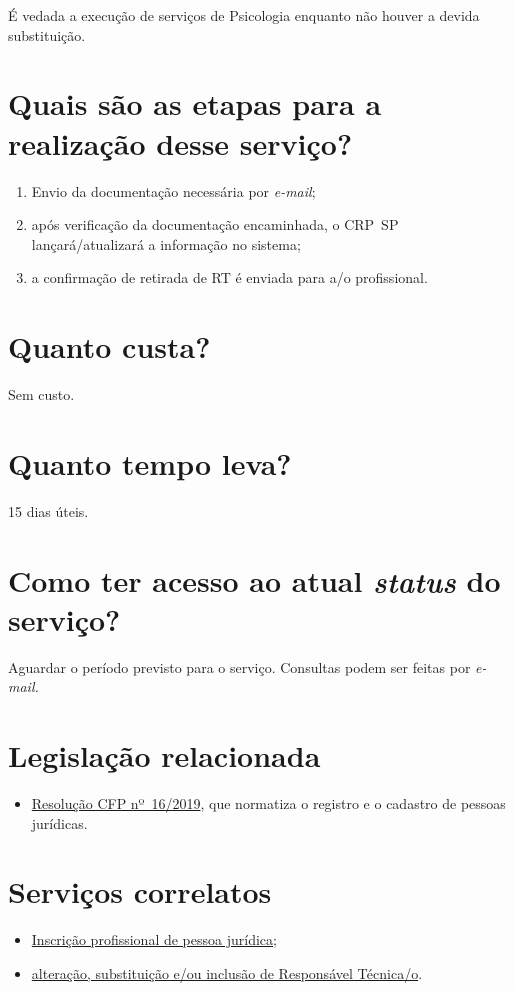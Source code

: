 É vedada a execução de serviços de Psicologia enquanto não houver a devida substituição.

\section{Quais são as etapas para a realização desse serviço?}

\begin{enumerate}
  \item  Envio da documentação necessária por \emph{e-mail};
  \item  após verificação da documentação encaminhada, o CRP~SP  lançará/atualizará a informação no sistema;
  \item  a confirmação de retirada de RT é enviada para a/o  profissional.
\end{enumerate}

\section{Quanto custa?}

Sem custo.

\section{Quanto tempo leva?}

15 dias úteis.

\section{Como ter acesso ao atual \emph{status} do serviço?}

Aguardar o período previsto para o serviço. Consultas podem ser feitas por \emph{e-mail.}

\section{Legislação relacionada}

\begin{itemize}
  \item  \href{https://atosoficiais.com.br/cfp/resolucao-administrativa-financeira-n-16-2019-altera-o-manual-de-procedimentos-administrativo-e-financeiro-do-sistema-conselhos-de-psicologia-anexo-da-resolucao-cfp-n-202018-a-resolucao-cfp-n-03-2007-a-resolucao-cfp-n-16-2019-e-da-outras-providencias}{Resolução  CFP nº~16/2019}, que normatiza o registro e o cadastro de pessoas  jurídicas.
\end{itemize}

\section{Serviços correlatos}

\begin{itemize}
  \item  \hyperref[chap:pj-inscricao]{Inscrição  profissional de pessoa jurídica};
  \item  \hyperref[chap:pj-rt]{alteração,  substituição e/ou inclusão de Responsável Técnica/o}.
\end{itemize}

\sumario